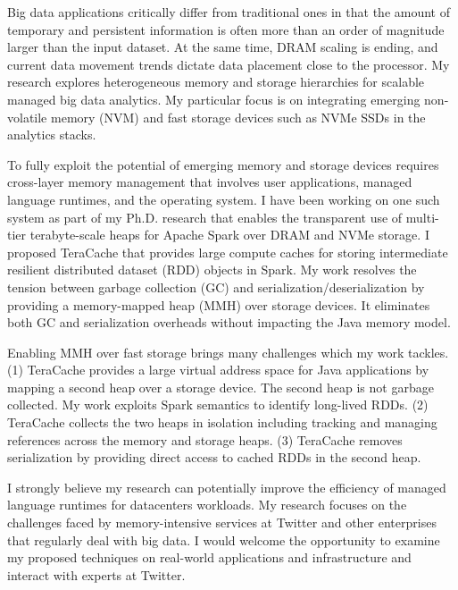 Big data applications critically differ from traditional ones in that
the amount of temporary and persistent information is often more than
an order of magnitude larger than the input dataset. At the same time,
DRAM scaling is ending, and current data movement trends dictate
data placement close to the processor. My research explores
heterogeneous memory and storage hierarchies for scalable managed
big data analytics. My particular focus is on integrating emerging
non-volatile memory (NVM) and fast storage devices such as
NVMe SSDs in the analytics stacks.

To fully exploit the potential of emerging memory and storage devices
requires cross-layer memory management that involves user
applications, managed language runtimes, and the operating system. I
have been working on one such system as part of my Ph.D. research that
enables the transparent use of multi-tier terabyte-scale heaps for
Apache Spark over DRAM and NVMe storage. I proposed TeraCache that
provides large compute caches for storing intermediate resilient
distributed dataset (RDD) objects in Spark. My work resolves the
tension between garbage collection (GC) and
serialization/deserialization by providing a memory-mapped heap (MMH)
over storage devices. It eliminates both GC and serialization
overheads without impacting the Java memory model.

Enabling MMH over fast storage brings many challenges which my work
tackles. (1) TeraCache provides a large virtual address space for Java
applications by mapping a second heap over a storage device. The
second heap is not garbage collected. My work exploits Spark semantics
to identify long-lived RDDs.  (2) TeraCache collects the two heaps in
isolation including tracking and managing references across the memory
and storage heaps.  (3) TeraCache removes serialization by providing
direct access to cached RDDs in the second heap. 

I strongly believe my research can potentially improve the efficiency
of managed language runtimes for datacenters workloads. My research
focuses on the challenges faced by memory-intensive services at
Twitter and other enterprises that regularly deal with big data.  I
would welcome the opportunity to examine my proposed techniques on
real-world applications and infrastructure and interact with experts
at Twitter.
